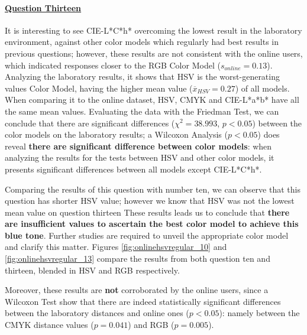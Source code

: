\paragraph{\ul{Question Thirteen}}
%
It is interesting to see CIE-L*C*h* overcoming the lowest result in the laboratory environment, against other color models which regularly had best results in previous questions; however, these results are not consistent with the online users, which indicated responses closer to the RGB Color Model
($s_{online} = 0.13$).
Analyzing the laboratory results, it shows that HSV is the worst-generating values Color Model, having the higher mean value ($\overline{x}_{HSV} = 0.27$) of all models. When comparing it to the online dataset,
HSV, CMYK and CIE-L*a*b* have all the same mean values. Evaluating the data with the Friedman Test, we can conclude that there are significant differences ($\chi^2 = 38.993$, $p < 0.05$)
between the color models on the laboratory results; a Wilcoxon Analysis ($p < 0.05$) does reveal \textbf{there are significant difference between color models}: when analyzing the results for the tests between HSV and other
color models, it presents significant differences between all models except CIE-L*C*h*. \par
%
Comparing the results of this question with number ten, we can observe that this question has shorter HSV value; however we know that HSV was not the lowest mean value on question thirteen
These results leads us to conclude that \textbf{there are insufficient values to ascertain the best color model to achieve this blue tone}. Further studies are required to unveil the
appropriate color model and clarify this matter. Figures \ref{fig:onlinehsvregular_10} and \ref{fig:onlinehsvregular_13} compare the results from both question ten and thirteen, blended in HSV and RGB respectively. \par
%
Moreover, these results are \textbf{not} corroborated by the online users, since a Wilcoxon Test show that there are indeed statistically significant differences between the laboratory distances
and online ones ($p < 0.05$): namely between the CMYK distance values ($p = 0.041$) and RGB ($p = 0.005$).
%
